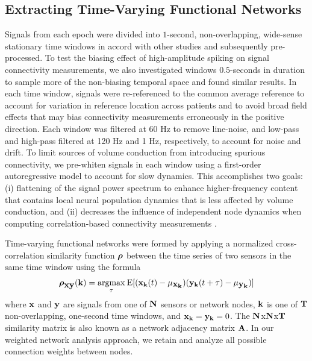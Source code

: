 \subsection{Extracting Time-Varying Functional Networks}
Signals from each epoch were divided into $1$-second, non-overlapping, wide-sense stationary time windows in accord with other studies \cite{kramer2010coalescence} and subsequently pre-processed. To test the biasing effect of high-amplitude spiking on signal connectivity measurements, we also investigated windows $0.5$-seconds in duration to sample more of the non-biasing temporal space and found similar results. In each time window, signals were re-referenced to the common average reference \cite{kramer2010coalescence, towle1999electrocorticographic} to account for variation in reference location across patients and to avoid broad field effects that may bias connectivity measurements erroneously in the positive direction. Each window was filtered at 60 Hz to remove line-noise, and low-pass and high-pass filtered at 120 Hz and 1 Hz, respectively, to account for noise and drift. To limit sources of volume conduction from introducing spurious connectivity, we pre-whiten signals in each window using a first-order autoregressive model to account for slow dynamics. This accomplishes two goals: (i) flattening of the signal power spectrum to enhance higher-frequency content that contains local neural population dynamics that is less affected by volume conduction, and (ii) decreases the influence of independent node dynamics when computing correlation-based connectivity measurements \cite{towle1999electrocorticographic, bullmore2001colored, lund2006non-white, arbabshirani2014impact}.

Time-varying functional networks were formed by applying a normalized cross-correlation similarity function $\boldsymbol{\displaystyle \rho}$ between the time series of two sensors in the same time window using the formula
    \begin{eqnarray}
        \boldsymbol{\displaystyle \rho}_{\mathbf{\displaystyle xy}}(\mathbf{\displaystyle k}) = \underset{\tau}{\operatorname{argmax}}\:{\mathrm{E}}[(\mathbf{\displaystyle x_k}(t) - \mu_{\mathbf{\displaystyle x_k}})(\mathbf{\displaystyle y_k}(t+\tau) - \mu_{\mathbf{\displaystyle y_k}})]
    \end{eqnarray}
    where $\mathbf{\displaystyle x}$ and $\mathbf{\displaystyle y}$ are signals from one of $\mathbf{\displaystyle N}$ sensors or network nodes, $\mathbf{\displaystyle k}$ is one of $\mathbf{\displaystyle T}$ non-overlapping, one-second time windows, and $\mathbf{\displaystyle x_{k}}=\mathbf{\displaystyle y_{k}}=0$. The $\mathbf{\displaystyle N}$x$\mathbf{\displaystyle N}$x$\mathbf{\displaystyle T}$ similarity matrix is also known as a network adjacency matrix $\mathbf{\displaystyle A}$. In our weighted network analysis approach, we retain and analyze all possible connection weights between nodes.

